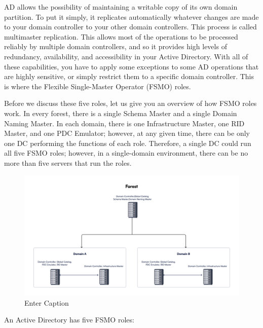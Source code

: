 AD allows the possibility of maintaining a writable copy of its own domain partition. To put it simply, it replicates automatically whatever changes are made to your domain controller to your other domain controllers. This process is called multimaster replication. This allows most of the operations to be processed reliably by multiple domain controllers, and so it provides high levels of redundancy, availability, and accessibility in your Active Directory. With all of these capabilities, you have to apply some exceptions to some AD operations that are highly sensitive, or simply restrict them to a specific domain controller. This is where the Flexible Single-Master Operator (FSMO) roles. 

Before we discuss these five roles, let us give you an overview of how FSMO roles work. In every forest, there is a single Schema Master and a single Domain Naming Master. In each domain, there is one Infrastructure Master, one RID Master, and one PDC Emulator; however, at any given time, there can be only one DC performing the functions of each role. Therefore, a single DC could run all five FSMO roles; however, in a single-domain environment, there can be no more than five servers that run the roles.

\begin{figure}
    \centering
    \includegraphics[width=0.75\linewidth]{adforest.png}
    \caption{Enter Caption}
    \label{fig:placeholder}
\end{figure}

An Active Directory has five FSMO roles:

